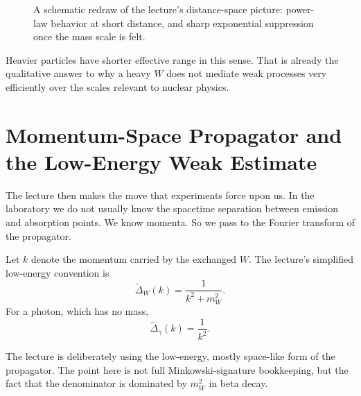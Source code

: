 \begin{figure}[htbp]
\centering
{}
\caption{A schematic redraw of the lecture's distance-space picture: power-law behavior at short distance, and sharp exponential suppression once the mass scale is felt.}
\end{figure}

Heavier particles have shorter effective range in this sense. That is already the qualitative answer to why a heavy \(W\) does not mediate weak processes very efficiently over the scales relevant to nuclear physics.

\section{Momentum-Space Propagator and the Low-Energy Weak Estimate}

The lecture then makes the move that experiments force upon us. In the laboratory we do not usually know the spacetime separation between emission and absorption points. We know momenta. So we pass to the Fourier transform of the propagator.

Let \(k\) denote the momentum carried by the exchanged \(W\). The lecture's simplified low-energy convention is
\begin{equation}
\widetilde{\Delta}_W(k)=\frac{1}{k^2+m_W^2}.
\end{equation}
For a photon, which has no mass,
\begin{equation}
\widetilde{\Delta}_\gamma(k)=\frac{1}{k^2}.
\end{equation}

\begin{remark}
The lecture is deliberately using the low-energy, mostly space-like form of the propagator. The point here is not full Minkowski-signature bookkeeping, but the fact that the denominator is dominated by \(m_W^2\) in beta decay.
\end{remark}


